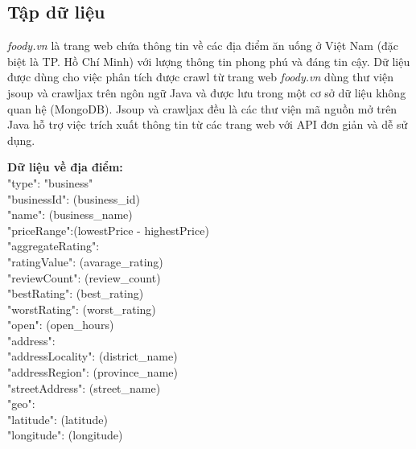 \documentclass[12pt]{extarticle}
\begin{document}
		\subsection{Tập dữ liệu}
			\par \textit{foody.vn} là trang web chứa thông tin về các địa điểm ăn uống ở Việt Nam (đặc biệt là TP. Hồ Chí Minh) với lượng thông tin phong phú và đáng tin cậy. Dữ liệu được dùng cho việc phân tích được crawl từ trang web \textit{foody.vn} dùng thư viện jsoup và crawljax trên ngôn ngữ Java và được lưu trong một cơ sở dữ liệu không quan hệ (MongoDB). Jsoup và crawljax đều là các thư viện mã nguồn mở trên Java hỗ trợ việc trích xuất thông tin từ các trang web với API đơn giản và dễ sử dụng.
			\par \textbf{Dữ liệu về địa điểm:}\\
				"type": "business"\\
				"businessId": (business\_id)\\
				"name": (business\_name)\\
				"priceRange":(lowestPrice - highestPrice)\\
				"aggregateRating":\\
				\hspace*{1.5cm}"ratingValue": (avarage\_rating)\\
				\hspace*{1.5cm}"reviewCount": (review\_count)\\
				\hspace*{1.5cm}"bestRating": (best\_rating)\\
				\hspace*{1.5cm}"worstRating": (worst\_rating)\\
				"open": (open\_hours)\\
				"address": \\
				\hspace*{1.5cm}"addressLocality": (district\_name)\\
				\hspace*{1.5cm}"addressRegion": (province\_name)\\
				\hspace*{1.5cm}"streetAddress": (street\_name)\\
				"geo":\\
				\hspace*{1.5cm}"latitude": (latitude)\\
				\hspace*{1.5cm}"longitude": (longitude)\\
\end{document}
